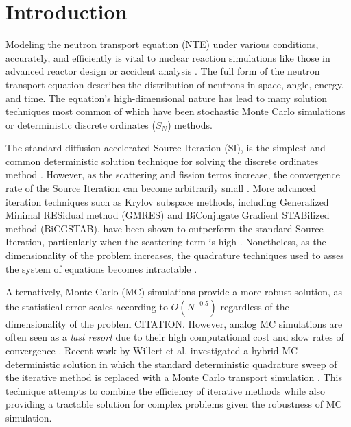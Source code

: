 \section{Introduction}
\label{sec:intro}

Modeling the neutron transport equation (NTE) under various conditions, accurately, and efficiently is vital to nuclear reaction simulations like those in advanced reactor design or accident analysis \cite{Duderstadt1977}.  The full form of the neutron transport equation describes the distribution of neutrons in space, angle, energy, and time. The equation's high-dimensional nature has lead to many solution techniques most common of which have been stochastic Monte Carlo simulations or deterministic discrete ordinates ($S_N$) methods. 

The standard diffusion accelerated Source Iteration (SI), is the simplest and common deterministic solution technique for solving the discrete ordinates method \cite{Lewis1984}. However, as the scattering and fission terms increase, the convergence rate of the Source Iteration can become arbitrarily small \cite{Warsa2002}. More advanced iteration techniques such as Krylov subspace methods, including Generalized Minimal RESidual method (GMRES) and BiConjugate Gradient STABilized method (BiCGSTAB), have been shown to outperform the standard Source Iteration, particularly when the scattering term is high \cite{Adams2002, Mcclarren2012}. Nonetheless, as the dimensionality of the problem increases, the quadrature techniques used to asses the system of equations becomes intractable \cite{Willert2013Thesis}.

Alternatively, Monte Carlo (MC) simulations provide a more robust solution, as the statistical error scales according to $O(N^{-0.5})$ regardless of the dimensionality of the problem CITATION. However, analog MC simulations are often seen as a \textit{last resort} due to their high computational cost and slow rates of convergence \cite{McClarren2018}. Recent work  by Willert et al. investigated a hybrid MC-deterministic solution in which the standard deterministic quadrature sweep of the iterative method is replaced with a Monte Carlo transport simulation \cite{Willert2013Thesis, ctk:jeff1}. This technique attempts to combine the efficiency of iterative methods while also providing a tractable solution for complex problems given the robustness of MC simulation.

